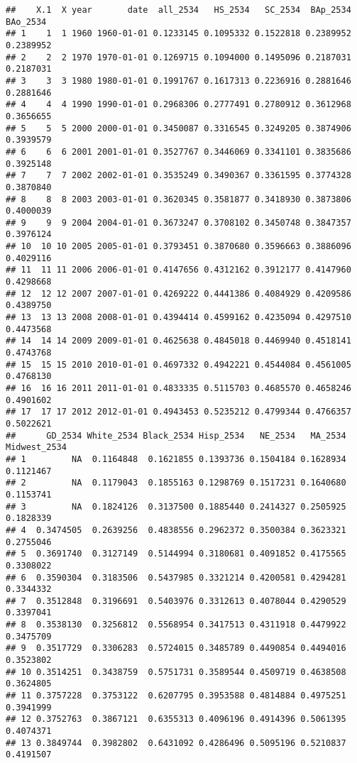 \documentclass[
]{article}
\begin{document}
\begin{verbatim}
##    X.1  X year       date  all_2534   HS_2534   SC_2534  BAp_2534  BAo_2534
## 1    1  1 1960 1960-01-01 0.1233145 0.1095332 0.1522818 0.2389952 0.2389952
## 2    2  2 1970 1970-01-01 0.1269715 0.1094000 0.1495096 0.2187031 0.2187031
## 3    3  3 1980 1980-01-01 0.1991767 0.1617313 0.2236916 0.2881646 0.2881646
## 4    4  4 1990 1990-01-01 0.2968306 0.2777491 0.2780912 0.3612968 0.3656655
## 5    5  5 2000 2000-01-01 0.3450087 0.3316545 0.3249205 0.3874906 0.3939579
## 6    6  6 2001 2001-01-01 0.3527767 0.3446069 0.3341101 0.3835686 0.3925148
## 7    7  7 2002 2002-01-01 0.3535249 0.3490367 0.3361595 0.3774328 0.3870840
## 8    8  8 2003 2003-01-01 0.3620345 0.3581877 0.3418930 0.3873806 0.4000039
## 9    9  9 2004 2004-01-01 0.3673247 0.3708102 0.3450748 0.3847357 0.3976124
## 10  10 10 2005 2005-01-01 0.3793451 0.3870680 0.3596663 0.3886096 0.4029116
## 11  11 11 2006 2006-01-01 0.4147656 0.4312162 0.3912177 0.4147960 0.4298668
## 12  12 12 2007 2007-01-01 0.4269222 0.4441386 0.4084929 0.4209586 0.4389750
## 13  13 13 2008 2008-01-01 0.4394414 0.4599162 0.4235094 0.4297510 0.4473568
## 14  14 14 2009 2009-01-01 0.4625638 0.4845018 0.4469940 0.4518141 0.4743768
## 15  15 15 2010 2010-01-01 0.4697332 0.4942221 0.4544084 0.4561005 0.4768130
## 16  16 16 2011 2011-01-01 0.4833335 0.5115703 0.4685570 0.4658246 0.4901602
## 17  17 17 2012 2012-01-01 0.4943453 0.5235212 0.4799344 0.4766357 0.5022621
##      GD_2534 White_2534 Black_2534 Hisp_2534   NE_2534   MA_2534 Midwest_2534
## 1         NA  0.1164848  0.1621855 0.1393736 0.1504184 0.1628934    0.1121467
## 2         NA  0.1179043  0.1855163 0.1298769 0.1517231 0.1640680    0.1153741
## 3         NA  0.1824126  0.3137500 0.1885440 0.2414327 0.2505925    0.1828339
## 4  0.3474505  0.2639256  0.4838556 0.2962372 0.3500384 0.3623321    0.2755046
## 5  0.3691740  0.3127149  0.5144994 0.3180681 0.4091852 0.4175565    0.3308022
## 6  0.3590304  0.3183506  0.5437985 0.3321214 0.4200581 0.4294281    0.3344332
## 7  0.3512848  0.3196691  0.5403976 0.3312613 0.4078044 0.4290529    0.3397041
## 8  0.3538130  0.3256812  0.5568954 0.3417513 0.4311918 0.4479922    0.3475709
## 9  0.3517729  0.3306283  0.5724015 0.3485789 0.4490854 0.4494016    0.3523802
## 10 0.3514251  0.3438759  0.5751731 0.3589544 0.4509719 0.4638508    0.3624805
## 11 0.3757228  0.3753122  0.6207795 0.3953588 0.4814884 0.4975251    0.3941999
## 12 0.3752763  0.3867121  0.6355313 0.4096196 0.4914396 0.5061395    0.4074371
## 13 0.3849744  0.3982802  0.6431092 0.4286496 0.5095196 0.5210837    0.4191507

\end{verbatim}
\end{document}
